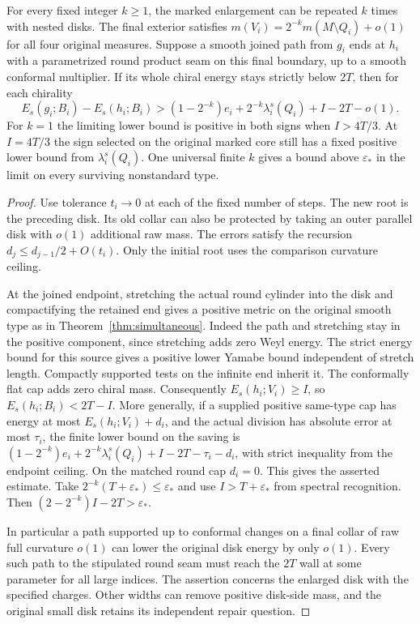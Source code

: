 \begin{corollary}
\label{cor:dyadic-repair}
For every fixed integer \(k\ge1\), the marked enlargement can be
repeated \(k\) times with nested disks. The final exterior satisfies
\(m(V_i)=2^{-k}m(M\setminus Q_i)+o(1)\) for all four original
measures. Suppose a smooth joined path from \(g_i\) ends at \(h_i\)
with a parametrized round product seam on this final boundary, up to
a smooth conformal multiplier. If its whole chiral energy stays
strictly below \(2T\), then for each chirality
\[
 E_s(g_i;B_i)-E_s(h_i;B_i)
   >(1-2^{-k})e_i+2^{-k}\lambda_i^s(Q_i)+I-2T-o(1).
\]
For \(k=1\) the limiting lower bound is positive in both signs when
\(I>4T/3\). At \(I=4T/3\) the sign selected on the original marked
core still has a fixed positive lower bound from
\(\lambda_i^s(Q_i)\).
One universal finite \(k\) gives a bound above \(\varepsilon_*\)
in the limit on every surviving nonstandard type.
\end{corollary}
\begin{proof}
Use tolerance \(t_i\to0\) at each of the fixed number of steps.
The new root is the preceding disk. Its old collar can also be
protected by taking an outer parallel disk with \(o(1)\) additional
raw mass. The errors satisfy the recursion \(d_j\le d_{j-1}/2+O(t_i)\).
Only the initial root uses the comparison curvature ceiling.

At the joined endpoint, stretching the actual round cylinder into
the disk and compactifying the retained end gives a positive metric
on the original smooth type as in Theorem~\ref{thm:simultaneous}.
Indeed the path and stretching stay in the positive component,
since stretching adds zero Weyl energy. The strict energy bound
for this source gives a positive lower Yamabe bound independent of
stretch length. Compactly supported tests on the infinite end
inherit it. The conformally flat cap adds zero chiral mass.
Consequently \(E_s(h_i;V_i)\ge I\), so \(E_s(h_i;B_i)<2T-I\).
More generally, if a supplied positive same-type cap has energy at
most \(E_s(h_i;V_i)+d_i\), and the actual division has absolute
error at most \(\tau_i\), the finite lower bound on the saving is
\((1-2^{-k})e_i+2^{-k}\lambda_i^s(Q_i)+I-2T-\tau_i-d_i\),
with strict inequality from the endpoint ceiling. On the matched
round cap \(d_i=0\). This gives the asserted estimate.
Take \(2^{-k}(T+\varepsilon_*)\le\varepsilon_*\) and use
\(I>T+\varepsilon_*\) from spectral recognition. Then
\((2-2^{-k})I-2T>\varepsilon_*\).

In particular a path supported up to conformal changes on a final
collar of raw full curvature \(o(1)\) can lower the original disk
energy by only \(o(1)\). Every such path to the stipulated round
seam must reach the \(2T\) wall at some parameter for all large
indices. The assertion concerns the enlarged disk with the specified
charges. Other widths can remove positive disk-side mass, and the
original small disk retains its independent repair question.
\end{proof}
